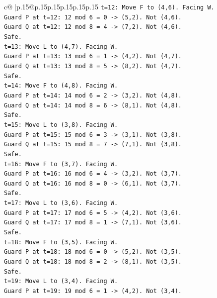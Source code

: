 \documentclass{article}
\begin{document}
{\begin{supertabular}{c@{$\;$}|p{.15\linewidth}@{}p{.15\linewidth}p{.15\linewidth}p{.15\linewidth}p{.15\linewidth}p{.15\linewidth}}
{{{\texttt{t=12: Move F to (4,6). Facing W.} \\
\texttt{Guard P at t=12: 12 mod 6 = 0 {-}> (5,2). Not (4,6).} \\
\texttt{Guard Q at t=12: 12 mod 8 = 4 {-}> (7,2). Not (4,6).} \\
\texttt{Safe.} \\
\texttt{t=13: Move L to (4,7). Facing W.} \\
\texttt{Guard P at t=13: 13 mod 6 = 1 {-}> (4,2). Not (4,7).} \\
\texttt{Guard Q at t=13: 13 mod 8 = 5 {-}> (8,2). Not (4,7).} \\
\texttt{Safe.} \\
\texttt{t=14: Move F to (4,8). Facing W.} \\
\texttt{Guard P at t=14: 14 mod 6 = 2 {-}> (3,2). Not (4,8).} \\
\texttt{Guard Q at t=14: 14 mod 8 = 6 {-}> (8,1). Not (4,8).} \\
\texttt{Safe.} \\
\texttt{t=15: Move L to (3,8). Facing W.} \\
\texttt{Guard P at t=15: 15 mod 6 = 3 {-}> (3,1). Not (3,8).} \\
\texttt{Guard Q at t=15: 15 mod 8 = 7 {-}> (7,1). Not (3,8).} \\
\texttt{Safe.} \\
\texttt{t=16: Move F to (3,7). Facing W.} \\
\texttt{Guard P at t=16: 16 mod 6 = 4 {-}> (3,2). Not (3,7).} \\
\texttt{Guard Q at t=16: 16 mod 8 = 0 {-}> (6,1). Not (3,7).} \\
\texttt{Safe.} \\
\texttt{t=17: Move L to (3,6). Facing W.} \\
\texttt{Guard P at t=17: 17 mod 6 = 5 {-}> (4,2). Not (3,6).} \\
\texttt{Guard Q at t=17: 17 mod 8 = 1 {-}> (7,1). Not (3,6).} \\
\texttt{Safe.} \\
\texttt{t=18: Move F to (3,5). Facing W.} \\
\texttt{Guard P at t=18: 18 mod 6 = 0 {-}> (5,2). Not (3,5).} \\
\texttt{Guard Q at t=18: 18 mod 8 = 2 {-}> (8,1). Not (3,5).} \\
\texttt{Safe.} \\
\texttt{t=19: Move L to (3,4). Facing W.} \\
\texttt{Guard P at t=19: 19 mod 6 = 1 {-}> (4,2). Not (3,4).} \\
}}}
\end{supertabular}}
\end{document}
